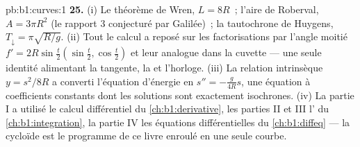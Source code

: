 \begin{solution}{pb:b1:curves:1}
\textbf{25.} (i) Le théorème de Wren, $L = 8R$~; l'aire de Roberval, $A =
3\pi R^2$ (le rapport $3$ conjecturé par Galilée)~; la tautochrone de
Huygens, $T_\downarrow = \pi\sqrt{R/g}$. (ii) Tout le
calcul a reposé sur les factorisations par l'angle moitié $f' =
2R\sin\frac t2(\sin\frac t2, \cos\frac t2)$ et leur analogue dans la
cuvette --- une seule identité alimentant la tangente, la  et l'horloge.
(iii) La relation intrinsèque $y = s^2/8R$ a converti l'équation
d'énergie en $s'' = -\frac{g}{4R}s$, une équation 
à coefficients constants dont les solutions sont exactement
isochrones. (iv) La partie I a utilisé le calcul différentiel du
\cref{ch:b1:derivative}, les parties II et III l' du
\cref{ch:b1:integration}, la partie IV les équations différentielles du
\cref{ch:b1:diffeq} --- la cycloïde est le programme de ce livre
enroulé en une seule courbe.
\end{solution}
